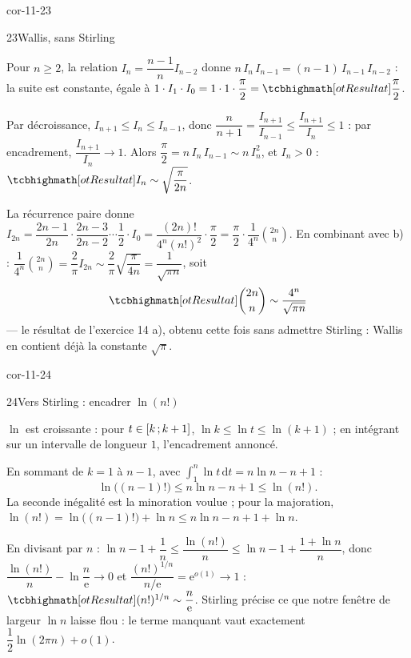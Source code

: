 \begin{blocLivre}{cor-11-23}
\begin{corrige}{23}{Wallis, sans Stirling}
\begin{questions}
  \item Pour $n\geqslant2$, la relation $I_n=\dfrac{n-1}{n}I_{n-2}$ donne
    $n\,I_n\,I_{n-1}=(n-1)\,I_{n-1}\,I_{n-2}$ : la suite est constante,
    égale à $1\cdot I_1\cdot I_0=1\cdot1\cdot\dfrac{\pi}{2}
    =\res{\dfrac{\pi}{2}}$.
  \item Par décroissance, $I_{n+1}\leqslant I_n\leqslant I_{n-1}$, donc
    $\dfrac{n}{n+1}=\dfrac{I_{n+1}}{I_{n-1}}\leqslant\dfrac{I_{n+1}}{I_n}\leqslant1$ :
    par encadrement, $\dfrac{I_{n+1}}{I_n}\to1$. Alors
    $\dfrac{\pi}{2}=n\,I_n\,I_{n-1}\sim n\,I_n^{2}$, et $I_n>0$ :
    $\res{I_n\sim\sqrt{\dfrac{\pi}{2n}}}$.
  \item La récurrence paire donne
    $I_{2n}=\dfrac{2n-1}{2n}\cdot\dfrac{2n-3}{2n-2}\cdots\dfrac12\cdot I_0
    =\dfrac{(2n)!}{4^{n}(n!)^{2}}\cdot\dfrac{\pi}{2}
    =\dfrac{\pi}{2}\cdot\dfrac{1}{4^{n}}\binom{2n}{n}$. En combinant avec
    b) : $\dfrac{1}{4^{n}}\binom{2n}{n}=\dfrac{2}{\pi}I_{2n}
    \sim\dfrac{2}{\pi}\sqrt{\dfrac{\pi}{4n}}=\dfrac{1}{\sqrt{\pi n}}$, soit
    \[
    \res{\binom{2n}{n}\sim\frac{4^{n}}{\sqrt{\pi n}}}
    \]
    — le résultat de l'exercice 14 a), obtenu cette fois sans admettre
    Stirling : Wallis en contient déjà la constante $\sqrt{\pi}$.
\end{questions}
\end{corrige}
\end{blocLivre}

\begin{blocLivre}{cor-11-24}
\begin{corrige}{24}{Vers Stirling : encadrer $\ln(n!)$}
\begin{questions}
  \item $\ln$ est croissante : pour $t\in\mathopen{[}k\,{;}\,k+1\mathclose{]}$,
    $\ln k\leqslant\ln t\leqslant\ln(k+1)$ ; en intégrant sur un intervalle
    de longueur $1$, l'encadrement annoncé.
  \item En sommant de $k=1$ à $n-1$, avec
    $\displaystyle\int_{1}^{n}\ln t\,\mathrm{d}t=n\ln n-n+1$ :
    \[
    \ln\bigl((n-1)!\bigr)\leqslant n\ln n-n+1\leqslant\ln(n!) .
    \]
    La seconde inégalité est la minoration voulue ; pour la majoration,
    $\ln(n!)=\ln\bigl((n-1)!\bigr)+\ln n\leqslant n\ln n-n+1+\ln n$.
  \item En divisant par $n$ :
    $\ln n-1+\dfrac1n\leqslant\dfrac{\ln(n!)}{n}\leqslant\ln n-1+\dfrac{1+\ln n}{n}$,
    donc $\dfrac{\ln(n!)}{n}-\ln\dfrac{n}{\mathrm{e}}\to0$ et
    $\dfrac{(n!)^{1/n}}{n/\mathrm{e}}=\mathrm{e}^{o(1)}\to1$ :
    $\res{(n!)^{1/n}\sim\dfrac{n}{\mathrm{e}}}$. Stirling précise ce que
    notre fenêtre de largeur $\ln n$ laisse flou : le terme manquant vaut
    exactement $\dfrac12\ln(2\pi n)+o(1)$.
\end{questions}
\end{corrige}
\end{blocLivre}


